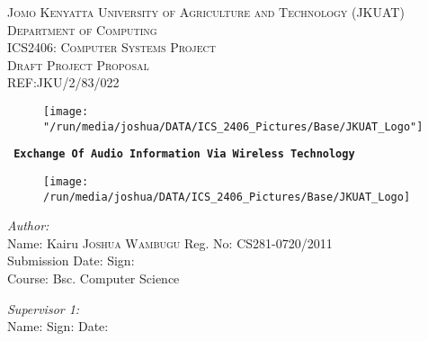 \documentclass[12pt,svgnames,smaller]{article} %
\begin{document}
\begin{titlepage}
\begin{center}


\textsc{\large Jomo Kenyatta University of Agriculture and Technology (JKUAT)}\\[0.4cm]
\textsc{\large Department of Computing}\\[0.4cm]
\textsc{\large ICS2406: Computer Systems Project  }\\[0.3cm]
\textsc{\large Draft Project Proposal }\\[0.3cm]
\textsc{\large REF:JKU/2/83/022 }\\[0.2 cm]

 
\begin{figure}
	\centering
	\texttt{[image: "/run/media/joshua/DATA/ICS\_2406\_Pictures/Base/JKUAT\_Logo"]}
	\label{fig:JKUAT_logo}
\end{figure}
\textbf{\texttt{ Exchange Of Audio Information Via Wireless Technology}}{\vspace*{20 mm}}
\end{center}


\begin{figure}
	\centering
	\texttt{[image: /run/media/joshua/DATA/ICS\_2406\_Pictures/Base/JKUAT\_Logo]}
	\label{fig:JKUAT_logo}
\end{figure}


\begin{minipage}{1.0\textwidth}	
	\begin{flushleft} \large
		\emph{Author:}\\
		Name: Kairu \textsc{Joshua Wambugu} Reg. No: CS281-0720/2011 \\
		Submission Date: \hrulefill  Sign: \hrulefill \\
		Course: Bsc. Computer Science
	\end{flushleft}
\end{minipage}

\begin{minipage}{1.0\textwidth}
	\begin{flushleft} \large
		\emph{Supervisor 1:} \\
		Name: \hrulefill Sign: \hrulefill Date: \hrulefill
	\end{flushleft}
\end{minipage}


\end{titlepage}
\end{document}
